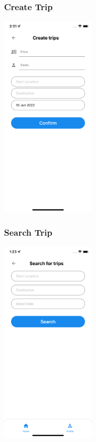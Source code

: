 \documentclass[hidelinks, 12pt, a4paper]{article}
\begin{document}
\subsubsection{Create Trip}
\begin{center}
  \includegraphics[height=10cm]{images/create_trip.png}
\end{center}
\vspace{1cm}
\subsubsection{Search Trip}
\begin{center}
  \includegraphics[height=10cm]{images/search_trips.png}
\end{center}
\vspace{1cm}
\end{document}
